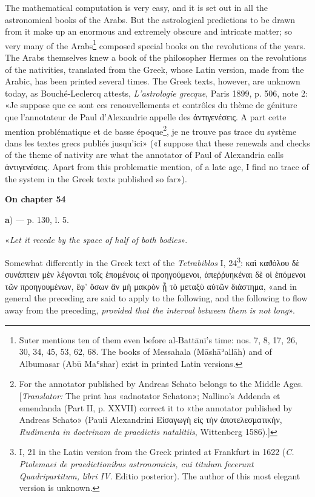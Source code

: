 \documentclass[11pt]{article}
\newcommand{\Pg}[1]{\marginpar{\footnotesize\color{gray}#1}}
\newcommand{\UnitHead}[2]{\par\setcounter{footnoteT}{0}\needspace{8\baselineskip}\bigskip\pdfbookmark[1]{#1}{unit-#2}\hypertarget{EN-#2}{}%
 {\large\bfseries\interlinepenalty=10000 #1\par}\nobreak\medskip}
\begin{document}
\par \Pg{I 305}The mathematical computation is very easy, and it is set out in all the astronomical books of the Arabs. But the astrological predictions to be drawn from it make up an enormous and extremely obscure and intricate matter; so very many of the Arabs\footnote{Suter mentions ten of them even before al-Battānī's time: nos. 7, 8, 17, 26, 30, 34, 45, 53, 62, 68. The books of Messahala (Māshāʾallāh) and of Albumasar (Abū Maʿshar) exist in printed Latin versions.} composed special books on the revolutions of the years. The Arabs themselves knew a book of the philosopher Hermes on the revolutions of the nativities, translated from the Greek, whose Latin version, made from the Arabic, has been printed several times. The Greek texts, however, are unknown today, as Bouché-Leclercq attests, \emph{L'astrologie grecque}, Paris 1899, p. 506, note 2: «Je suppose que ce sont ces renouvellements et contrôles du thème de géniture que l’annotateur de Paul d’Alexandrie appelle des {\greekfont ἀντιγενέσεις}. A part cette mention problématique et de basse époque\footnote{For the annotator published by Andreas Schato belongs to the Middle Ages. [\emph{Translator:} The print has «adnotator Schaton»; Nallino's Addenda et emendanda (Part II, p. XXVII) correct it to «the annotator published by Andreas Schato» (Pauli Alexandrini {\greekfont Εἰσαγωγὴ εἰς τὴν ἀποτελεσματικήν}, \emph{Rudimenta in doctrinam de praedictis natalitiis}, Wittenberg 1586).]}, je ne trouve pas trace du système dans les textes grecs publiés jusqu’ici» («I suppose that these renewals and checks of the theme of nativity are what the annotator of Paul of Alexandria calls {\greekfont ἀντιγενέσεις}. Apart from this problematic mention, of a late age, I find no trace of the system in the Greek texts published so far»).\par
\UnitHead{On chapter 54}{A54}
\par\begin{center}\textbf{a}) — p. 130, l. 5.\end{center}
\par «\emph{Let it recede by the space of half of both bodies}».\par
\par Somewhat differently in the Greek text of the \emph{Tetrabiblos} I, 24\footnote{I, 21 in the Latin version from the Greek printed at Frankfurt in 1622 (\emph{C. Ptolemaei de praedictionibus astronomicis, cui titulum fecerunt Quadripartitum, libri IV.} Editio posterior). The author of this most elegant version is unknown.}: {\greekfont καὶ καϑόλου δὲ συνάπτειν μὲν λέγονται τοῖς ἑπομένοις οἱ προηγούμενοι, ἀπεῤῥυηκέναι δὲ οἱ ἑπόμενοι τῶν προηγουμένων, ἔφ’ ὅσων ἂν μὴ μακρὸν ᾖ τὸ μεταξὺ αὐτῶν διάστημα}, «and in general the preceding are said to apply to the following, and the following to flow away from the preceding, \emph{provided that the interval between them is not long}».\par
\end{document}

